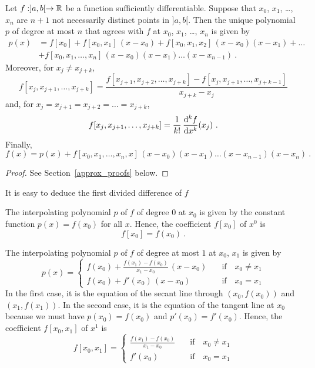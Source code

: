 \begin{theorem}
Let $f: ]a,b[ \rightarrow \mathbb{R}$ be a function sufficiently
differentiable.  Suppose that $x_0$, $x_1$, \ldots, $x_n$ are
$n+1$ not necessarily distinct points in $]a,b[$.
Then the unique polynomial $p$ of degree at most $n$ that agrees with
$f$ at $x_0$, $x_1$, \ldots, $x_n$ is given by
\begin{equation} \label{NFDDF}
\begin{split}
p(x) &= f[x_0]+f[x_0,x_1]\,(x-x_0) +
f[x_0,x_1,x_2]\,(x-x_0)(x-x_1) + \ldots \\
 &+f[x_0,x_1,\dots,x_n]\,(x-x_0)(x-x_1)\dots(x-x_{n-1}) \ .
\end{split}
\end{equation}
Moreover, for $x_j \neq x_{j+k}$,
\begin{equation}\label{divide1}
f[x_j,x_{j+1},\dots,x_{j+k}] =
\frac{f[x_{j+1},x_{j+2},\dots,x_{j+k}]-f[x_j,x_{j+1},\dots,x_{j+k-1}]}
{x_{j+k}-x_j}
\end{equation}
and, for $x_j = x_{j+1} = x_{j+2} = \ldots = x_{j+k}$,
\begin{equation}\label{divide2}
f[x_j,x_{j+1},\dots,x_{j+k}] = \frac{1}{k!}\,\dydxn{f}{x}{k}(x_j) \ .
\end{equation}
Finally,
\begin{equation} \label{IPerror}
f(x) = p(x) +
f[x_0,x_1,\dots,x_n,x]\,(x-x_0)(x-x_1)\dots(x-x_{n-1})(x-x_n) \ .
\end{equation}
\label{InterpTh}
\end{theorem}

\begin{proof}
See Section~\ref{approx_proofs} below.
\end{proof}

It is easy to deduce the first divided difference of $f$

  The interpolating polynomial $p$ of $f$ of degree $0$ at
$x_0$ is given by the constant function $p(x) = f(x_0)$ for all $x$.
Hence, the coefficient $f[x_0]$ of $x^0$ is
\[
f[x_0] = f(x_0) \ .
\]

 The interpolating polynomial $p$ of $f$ of degree at most
$1$ at $x_0$, $x_1$ is given by
\[
p(x) = \begin{cases} \displaystyle
f(x_0) + \frac{f(x_1)-f(x_0)}{x_1-x_0} \, (x-x_0) & \quad \text{if} \quad
x_0 \neq x_1 \\
f(x_0) + f'(x_0)\, (x-x_0) & \quad \text{if} \quad x_0 = x_1
\end{cases}
\]
In the first case, it is the equation of the secant line through
$(x_0,f(x_0))$ and $(x_1,f(x_1))$.  In the second case, it is the
equation of the tangent line at $x_0$ because we must have
$p(x_0)=f(x_0)$ and $p'(x_0) = f'(x_0)$.  Hence, the coefficient
$f[x_0,x_1]$ of $x^1$ is
\[
f[x_0,x_1] = \begin{cases}
\displaystyle \frac{f(x_1)-f(x_0)}{x_1-x_0} & \quad \text{if} \quad
x_0 \neq x_1 \\
f'(x_0) & \quad \text{if} \quad x_0 = x_1
\end{cases}
\]


